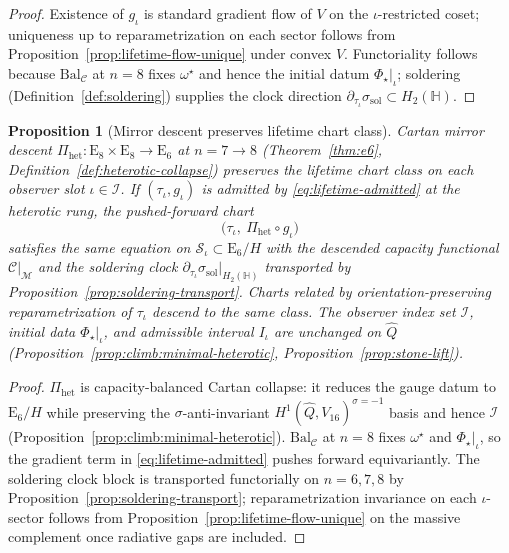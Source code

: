 \documentclass[11pt]{article}
\theoremstyle{plain}
\newtheorem{proposition}[theorem]{Proposition}
\theoremstyle{definition}
\theoremstyle{remark}
\numberwithin{equation}{section}
\newcommand{\Quat}{\mathbb{H}}
\newcommand{\E}[1]{\mathrm{E}_{#1}}
\newcommand{\capacity}{\mathcal{C}}
\newcommand{\orderparam}{\Phi}
\begin{document}
\begin{proof}
Existence of $g_\iota$ is standard gradient flow of $V$ on the
$\iota$-restricted coset; uniqueness up to reparametrization on each sector
follows from Proposition~\ref{prop:lifetime-flow-unique} under convex $V$.
Functoriality follows because
$\mathrm{Bal}_{\mathcal{C}}$ at $n=8$ fixes $\omega^\star$ and hence the
initial datum $\orderparam_\star|_\iota$; soldering
(Definition~\ref{def:soldering}) supplies the clock direction
$\partial_{\tau_\iota}\sigma_{\mathrm{sol}}\subset H_2(\Quat)$.
\end{proof}

\begin{proposition}[Mirror descent preserves lifetime chart class]
\label{prop:lifetime-descent}
Cartan mirror descent $\Pi_{\mathrm{het}}:\E{8}\times\E{8}\to\E{6}$ at
$n=7\to8$ (Theorem~\ref{thm:e6}, Definition~\ref{def:heterotic-collapse})
preserves the lifetime chart \emph{class} on each observer slot
$\iota\in\mathcal{I}$. If $(\tau_\iota,g_\iota)$ is admitted by
\eqref{eq:lifetime-admitted} at the heterotic rung, the pushed-forward chart
\begin{equation}\label{eq:lifetime-descent}
  \bigl(\tau_\iota,\ \Pi_{\mathrm{het}}\circ g_\iota\bigr)
\end{equation}
satisfies the same equation on $\mathcal{S}_\iota\subset\E{6}/H$ with the
descended capacity functional $\capacity|_{\mathcal{M}}$ and the soldering clock
$\partial_{\tau_\iota}\sigma_{\mathrm{sol}}|_{H_2(\Quat)}$ transported by
Proposition~\ref{prop:soldering-transport}. Charts related by
orientation-preserving reparametrization of $\tau_\iota$ descend to the same
class. The observer index set $\mathcal{I}$, initial data
$\orderparam_\star|_\iota$, and admissible interval $I_\iota$ are unchanged on
$\hat Q$ (Proposition~\ref{prop:climb:minimal-heterotic},
Proposition~\ref{prop:stone-lift}).
\end{proposition}

\begin{proof}
$\Pi_{\mathrm{het}}$ is capacity-balanced Cartan collapse: it reduces the
gauge datum to $\E{6}/H$ while preserving the $\sigma$-anti-invariant
$H^1(\hat Q,V_{16})^{\sigma=-1}$ basis and hence $\mathcal{I}$
(Proposition~\ref{prop:climb:minimal-heterotic}). $\mathrm{Bal}_{\mathcal{C}}$
at $n=8$ fixes $\omega^\star$ and $\orderparam_\star|_\iota$, so the gradient
term in \eqref{eq:lifetime-admitted} pushes forward equivariantly. The
soldering clock block is transported functorially on $n=6,7,8$ by
Proposition~\ref{prop:soldering-transport}; reparametrization invariance on
each $\iota$-sector follows from Proposition~\ref{prop:lifetime-flow-unique}
on the massive complement once radiative gaps are included.
\end{proof}
\end{document}

